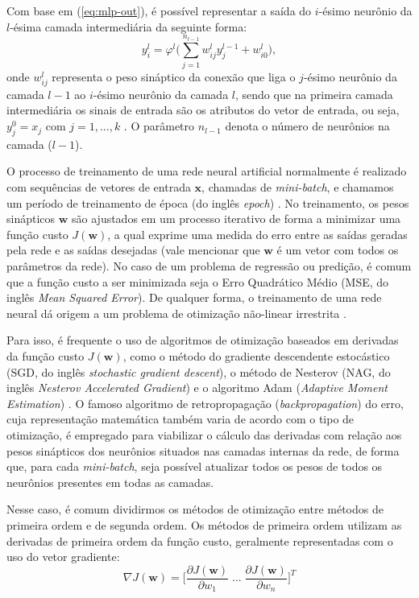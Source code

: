 \documentclass[a4paper, 12pt]{article}
\begin{document}
Com base em (\ref{eq:mlp-out}), é possível representar a saída do $i$-ésimo neurônio da $l$-ésima camada intermediária da seguinte forma: 
\begin{equation}
	y_{i}^{l} = \varphi^{l} \Big(\sum_{j=1}^{n_{l-1}} w_{ij}^{l} y_{j}^{l-1} + w_{i0}^{l} \Big)\mathtt{,}
\end{equation}
onde $w_{ij}^{l}$ representa o peso sináptico da conexão que liga o $j$-ésimo neurônio da camada $l-1$ ao $i$-ésimo neurônio da camada $l$, sendo que na primeira camada intermediária os sinais de entrada são os atributos do vetor de entrada, ou seja, $y_{j}^{0} = x_{j}$ com $j = 1, ..., k$ \cite{boccato2013novas}. O parâmetro $n_{l-1}$ denota o número de neurônios na camada ($l-1$). 

O processo de treinamento de uma rede neural artificial normalmente é realizado com sequências de vetores de entrada $\mathbf{x}$, chamadas de \textit{mini-batch}, e chamamos um período de treinamento de época (do inglês \textit{epoch}) \cite{geron2019hands}. No treinamento, os pesos sinápticos $\mathbf{w}$ são ajustados em um processo iterativo de forma a minimizar uma função custo $J(\mathbf{w})$, a qual exprime uma medida do erro entre as saídas geradas pela rede e as saídas desejadas (vale mencionar que $\mathbf{w}$ é um vetor com todos os parâmetros da rede). No caso de um problema de regressão ou predição, é comum que a função custo a ser minimizada seja o Erro Quadrático Médio (MSE, do inglês \textit{Mean Squared Error}). De qualquer forma, o treinamento de uma rede neural dá origem a um problema de otimização não-linear irrestrita \cite{haykin2010neural}.

Para isso, é frequente o uso de algoritmos de otimização baseados em derivadas da função custo $J(\mathbf{w})$, como o método do gradiente descendente estocástico (SGD, do inglês \textit{stochastic gradient descent}), o método de Nesterov (NAG, do inglês \textit{Nesterov Accelerated Gradient}) e o algoritmo Adam (\textit{Adaptive Moment Estimation}) \cite{geron2019hands}. O famoso algoritmo de retropropagação (\textit{backpropagation}) do erro, cuja representação matemática também varia de acordo com o tipo de otimização, é empregado para viabilizar o cálculo das derivadas com relação aos pesos sinápticos dos neurônios situados nas camadas internas da rede, de forma que, para cada \textit{mini-batch}, seja possível atualizar todos os pesos de todos os neurônios presentes em todas as camadas. 

Nesse caso, é comum dividirmos os métodos de otimização entre métodos de primeira ordem e de segunda ordem. Os métodos de primeira ordem utilizam as derivadas de primeira ordem da função custo, geralmente representadas com o uso do vetor gradiente:
\begin{equation}
	\nabla J(\mathbf{w}) = \Big[\frac{\partial J(\mathbf{w})}{\partial w_1} \; ...\;  \frac{\partial J(\mathbf{w})}{\partial w_n} \Big]^T
\end{equation}
\end{document}
